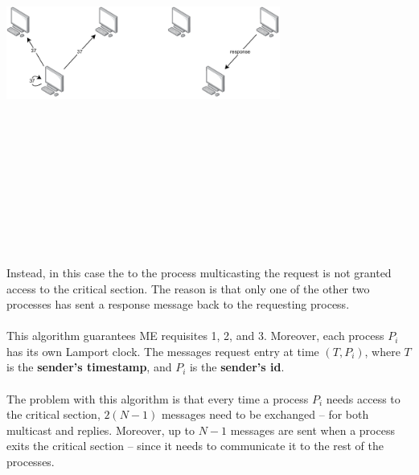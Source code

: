 \documentclass{article}
\begin{document}
\begin{center}
	\includegraphics[width=9cm, height=13cm, keepaspectratio]{assets/multicast-2.pdf}
\end{center}
Instead, in this case the to the process multicasting the request is not granted access to the critical section. The reason is that only one of the other two processes has sent a response message back to the requesting process. \\ \\
This algorithm guarantees ME requisites 1, 2, and 3. Moreover, each process $P_i$ has its own Lamport clock. The messages request entry at time $(T, P_i)$, where $T$ is the \textbf{sender's timestamp}, and $P_i$ is the \textbf{sender's id}. \\ \\
The problem with this algorithm is that every time a process $P_i$ needs access to the critical section, $2(N-1)$ messages need to be exchanged -- for both multicast and replies. Moreover, up to $N - 1$ messages are sent when a process exits the critical section -- since it needs to communicate it to the rest of the processes.
\end{document}
